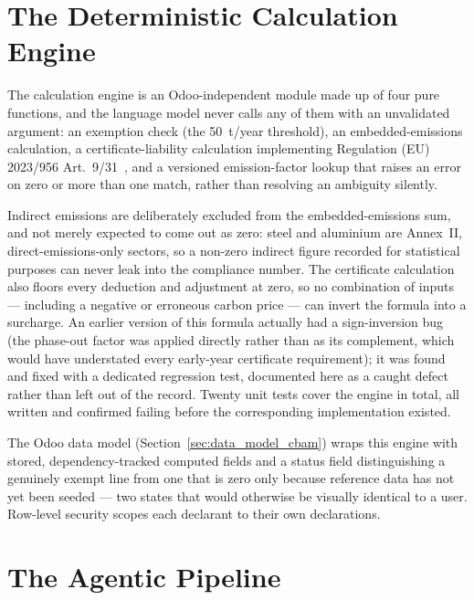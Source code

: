 \section{The Deterministic Calculation Engine}
\label{sec:calc_engine_cbam}

The calculation engine is an Odoo-independent module made up of four pure
functions, and the language model never calls any of them with an
unvalidated argument: an exemption check (the 50~t/year threshold), an
embedded-emissions calculation, a certificate-liability calculation
implementing Regulation (EU) 2023/956 Art.~9/31~\cite{eu2023956}, and a
versioned emission-factor lookup that raises an error on zero or more
than one match, rather than resolving an ambiguity silently.

Indirect emissions are deliberately excluded from the embedded-emissions
sum, and not merely expected to come out as zero: steel and aluminium
are Annex~II, direct-emissions-only sectors, so a non-zero indirect
figure recorded for statistical purposes can never leak into the
compliance number. The certificate calculation also floors every
deduction and adjustment at zero, so no combination of inputs ---
including a negative or erroneous carbon price --- can invert the
formula into a surcharge. An earlier version of this formula actually
had a sign-inversion bug (the phase-out factor was applied directly
rather than as its complement, which would have understated every
early-year certificate requirement); it was found and fixed with a
dedicated regression test, documented here as a caught defect rather
than left out of the record. Twenty unit tests cover the engine in
total, all written and confirmed failing before the corresponding
implementation existed.

The Odoo data model (Section~\ref{sec:data_model_cbam}) wraps this engine
with stored, dependency-tracked computed fields and a status field
distinguishing a genuinely exempt line from one that is zero only because
reference data has not yet been seeded --- two states that would
otherwise be visually identical to a user. Row-level security scopes each
declarant to their own declarations.

\section{The Agentic Pipeline}
\label{sec:agentic_pipeline_cbam}

